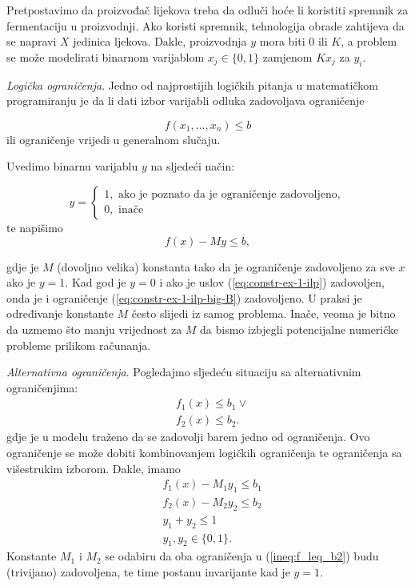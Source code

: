 \documentclass[a4paper, utf8, 11pt, colorlinks]{book}
\begin{document}
Pretpostavimo da proizvođač lijekova treba da odluči hoće li koristiti spremnik za fermentaciju u proizvodnji. Ako koristi spremnik, tehnologija obrade zahtijeva da se napravi $X$ jedinica ljekova. Dakle, proizvodnja $y$ mora biti 0 ili $K$, a problem se može modelirati binarnom varijablom $x_j \in \{ 0, 1\}$ zamjenom $Kx_j$ za $y_i$. 

\emph{Logička ograničenja}. Jedno od najprostijih logičkih pitanja u matematičkom programiranju je da li dati izbor varijabli odluka zadovoljava ograničenje

\begin{equation}\label{eq:constr-ex-1-ilp}
   f(x_1,\ldots, x_n )\leq b
\end{equation}
 ili   ograničenje vrijedi u generalnom slučaju.
 
 Uvedimo binarnu varijablu $y$ na sljedeći način:
 
$$y =\begin{cases}
1, \mbox{ ako je poznato da je ograničenje zadovoljeno}, \\
0, \mbox{ inače}
\end{cases}$$
te napišimo 
\begin{equation}\label{eq:constr-ex-1-ilp-big-B}
   f(x) - M y \leq b,
\end{equation}

gdje je $M$ (dovoljno velika) konstanta tako da je 
ograničenje zadovoljeno za sve $x$ ako je $y =1$. Kad god je $y=0$ i ako je uslov (\ref{eq:constr-ex-1-ilp}) zadovoljen, onda je i ograničenje (\ref{eq:constr-ex-1-ilp-big-B}) zadovoljeno. U praksi je određivanje konstante $M$ često slijedi iz samog problema. Inače, veoma je bitno da uzmemo što manju vrijednost za $M$ da bismo izbjegli potencijalne numeričke probleme prilikom računanja. 

\emph{Alternativna ograničenja}. Pogledajmo sljedeću situaciju sa alternativnim ograničenjima:
\begin{align}
     &f_1(x) \leq b_1 \vee \nonumber\\
     &f_2(x) \leq b_2.\label{ineq:f_leq_b2}
\end{align}
gdje je u modelu traženo da se zadovolji barem jedno od ograničenja. 
Ovo ograničenje se može dobiti kombinovanjem logičkih ograničenja te ograničenja sa višestrukim izborom. Dakle, imamo 
\begin{align*}
      &f_1(x) - M_1 y_1  \leq b_1 \\
      &f_2(x) - M_2 y_2  \leq b_2 \\
      & y_1 + y_2 \leq 1 \\
      & y_1, y_2 \in \{0, 1\}.
\end{align*}
Konstante $M_1$ i $M_2$ se odabiru da oba ograničenja u (\ref{ineq:f_leq_b2})  budu (trivijano) zadovoljena, te time postanu invarijante kad je $y=1$.
\end{document}
